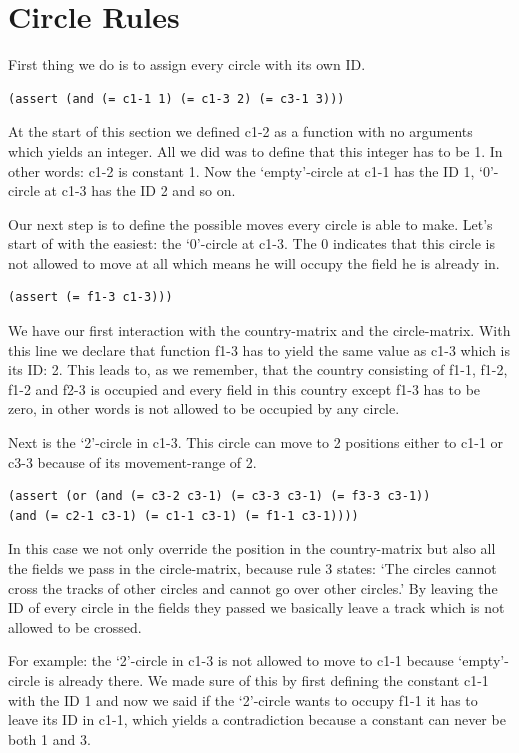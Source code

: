 \section{Circle Rules}
First thing we do is to assign every circle with its own ID.
\begin{lstlisting}
(assert (and (= c1-1 1) (= c1-3 2) (= c3-1 3)))
\end{lstlisting}
At the start of this section we defined c1-2 as a function with no arguments which yields an integer. All we did was to define that this integer has to be 1. In other words: c1-2 is constant 1.
Now the `empty'-circle at c1-1 has the ID 1, `0'-circle at c1-3 has the ID 2 and so on.

Our next step is to define the possible moves every circle is able to make. Let's start of with the easiest: the `0'-circle at c1-3. The 0 indicates that this circle is not allowed to move at all which means he will occupy the field he is already in.
\begin{lstlisting}
(assert (= f1-3 c1-3)))
\end{lstlisting}
We have our first interaction with the country-matrix and the circle-matrix. With this line we declare that function f1-3 has to yield the same value as c1-3 which is its ID: 2. This leads to, as we remember, that the country consisting of f1-1, f1-2, f1-2 and f2-3 is occupied and every field in this country except f1-3 has to be zero, in other words is not allowed to be occupied by any circle.

Next is the `2'-circle in c1-3. This circle can move to 2 positions either to c1-1 or c3-3 because of its movement-range of 2.
\begin{lstlisting}
(assert (or (and (= c3-2 c3-1) (= c3-3 c3-1) (= f3-3 c3-1)) 
(and (= c2-1 c3-1) (= c1-1 c3-1) (= f1-1 c3-1))))
\end{lstlisting}
In this case we not only override the position in the country-matrix but also all the fields we pass in the circle-matrix, because rule 3 states: `The circles cannot cross the tracks of other circles and cannot go over other circles.' By leaving the ID of every circle in the fields they passed we basically leave a track which is not allowed to be crossed.

For example: the `2'-circle in c1-3 is not allowed to move to c1-1 because `empty'-circle is already there. We made sure of this by first defining the constant c1-1 with the ID 1 and now we said if the `2'-circle wants to occupy f1-1 it has to leave its ID in c1-1, which yields a contradiction because a constant can never be both 1 and 3.

